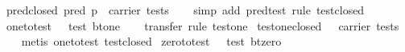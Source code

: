 \begin{isabellebody}
\ pred{}closed{}\ {}pred\ p\ {}\ carrier\ tests{}\isanewline
%
\isadelimproof
\ \ %
\endisadelimproof
%
\isatagproof
{}\isamarkupfalse%
\ {}simp\ add{}\ pred{}test{}\ rule\ test{}closed{}%
\endisatagproof
{\isafoldproof}%
%
\isadelimproof
\isanewline
%
\endisadelimproof
\isanewline
\isanewline
\isanewline
{}\isamarkupfalse%
\ one{}to{}test{}\ {}{}\ {}\ test\ {}bt{}one{}{}\isanewline
%
\isadelimproof
\ \ %
\endisadelimproof
%
\isatagproof
{}\isamarkupfalse%
\ {}transfer{}\ rule\ test{}one{}%
\endisatagproof
{\isafoldproof}%
%
\isadelimproof
\isanewline
%
\endisadelimproof
\isanewline
{}\isamarkupfalse%
\ test{}one{}closed{}\ {}{}\ {}\ carrier\ tests{}\isanewline
%
\isadelimproof
\ \ %
\endisadelimproof
%
\isatagproof
{}\isamarkupfalse%
\ {}metis\ one{}to{}test\ test{}closed{}%
\endisatagproof
{\isafoldproof}%
%
\isadelimproof
\isanewline
%
\endisadelimproof
\isanewline
{}\isamarkupfalse%
\ zero{}to{}test{}\ {}{}\ {}\ test\ {}bt{}zero{}{}\isanewline

\end{isabellebody}
